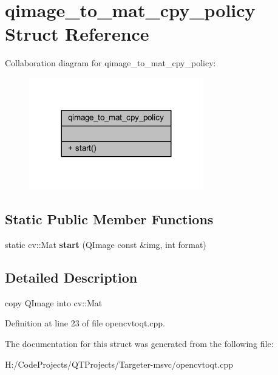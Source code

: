 \hypertarget{structqimage__to__mat__cpy__policy}{}\section{qimage\+\_\+to\+\_\+mat\+\_\+cpy\+\_\+policy Struct Reference}
\label{structqimage__to__mat__cpy__policy}


Collaboration diagram for qimage\+\_\+to\+\_\+mat\+\_\+cpy\+\_\+policy\+:
\nopagebreak
\begin{figure}[H]
\begin{center}
\leavevmode
\includegraphics[width=215pt]{structqimage__to__mat__cpy__policy__coll__graph}
\end{center}
\end{figure}
\subsection*{Static Public Member Functions}
\begin{DoxyCompactItemize}
\item 
\mbox{\label{structqimage__to__mat__cpy__policy_afc5c916569a7690ccb496d2133e9dc4b}} 
static cv\+::\+Mat {\bfseries start} (Q\+Image const \&img, int format)
\end{DoxyCompactItemize}


\subsection{Detailed Description}
copy Q\+Image into cv\+::\+Mat 

Definition at line 23 of file opencvtoqt.\+cpp.



The documentation for this struct was generated from the following file\+:\begin{DoxyCompactItemize}
\item 
H\+:/\+Code\+Projects/\+Q\+T\+Projects/\+Targeter-\/msvc/opencvtoqt.\+cpp\end{DoxyCompactItemize}
